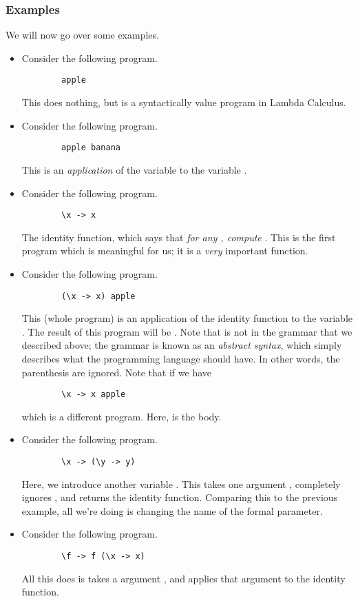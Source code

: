 \documentclass[letterpaper]{article}
\begin{document}
\subsubsection{Examples}
We will now go over some examples. 
\begin{itemize}
    \item Consider the following program. 
    \begin{verbatim}
        apple
    \end{verbatim}
    This does nothing, but is a syntactically value program in Lambda Calculus.

    \item Consider the following program. 
    \begin{verbatim}
        apple banana
    \end{verbatim}
    This is an \emph{application} of the variable  to the variable .

    \item Consider the following program. 
    \begin{verbatim}
        \x -> x
    \end{verbatim}
    The identity function, which says that \emph{for any , compute }. This is the first program which is meaningful for us; it is a \emph{very} important function. 

    \item Consider the following program.
    \begin{verbatim}
        (\x -> x) apple
    \end{verbatim}
    This (whole program) is an application of the identity function to the variable . The result of this program will be . Note that \code{()} is not in the grammar that we described above; the grammar is known as an \emph{abstract syntax}, which simply describes what the programming language should have. In other words, the parenthesis are ignored. Note that if we have 
    \begin{verbatim}
        \x -> x apple 
    \end{verbatim}
    which is a different program. Here,  is the body. 

    \item Consider the following program.
    \begin{verbatim}
        \x -> (\y -> y)
    \end{verbatim}
    Here, we introduce another variable . This takes one argument , completely ignores , and returns the identity function. Comparing this to the previous example, all we're doing is changing the name of the formal parameter. 
    
    \item Consider the following program.
    \begin{verbatim}
        \f -> f (\x -> x)
    \end{verbatim}
    All this does is takes a argument , and applies that argument to the identity function.
\end{itemize}
\end{document}
